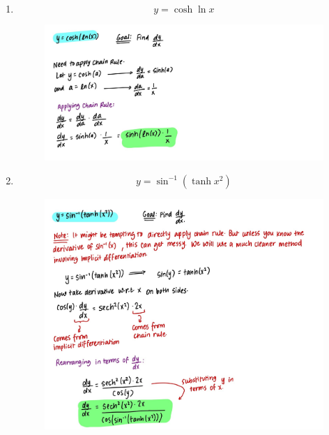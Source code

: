 \documentclass{article}
\begin{document}
\begin{enumerate}
\begin{figure}[H]
        \label{fig:Q3}
    \end{figure}
    \item $$y = \cosh{\ln x}$$
    \begin{figure}[H]
        \centering
        \includegraphics[width=\linewidth]{Q4.jpg}
        \label{fig:Q4}
    \end{figure}
    \newpage
    \item $$y = \sin^{-1}({\tanh{x^2}})$$
    \begin{figure}[H]
        \centering
        \includegraphics[width=\linewidth]{Q5.jpg}
        \label{fig:Q5}
    \end{figure}
\end{enumerate}
\end{document}
